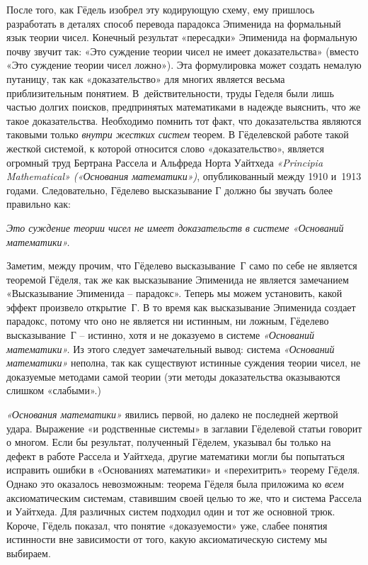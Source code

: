 \documentclass[../main.tex]{subfiles}
\begin{document}
После того, как Гёдель изобрел эту кодирующую схему, ему пришлось разработать в деталях способ перевода парадокса Эпименида на формальный язык теории чисел. Конечный результат «пересадки» Эпименида на формальную почву звучит так: «Это суждение теории чисел не имеет доказательства» (вместо «Это суждение теории чисел ложно»). Эта формулировка может создать немалую путаницу, так как «доказательство» для многих является весьма приблизительным понятием. В~действительности, труды Геделя были лишь частью долгих поисков, предпринятых математиками в надежде выяснить, что же такое доказательства. Необходимо помнить тот факт, что доказательства являются таковыми только \emph{внутри жестких систем} теорем. В Гёделевской работе такой жесткой системой, к которой относится слово «доказательство», является огромный труд Бертрана Рассела и Альфреда Норта Уайтхеда \emph{«Principia Mathematical» («Основания математики»)}, опубликованный между 1910 и~1913 годами. Следовательно, Гёделево высказывание Г должно бы звучать более правильно как:

\emph{Это суждение теории чисел не имеет доказательств в системе «Оснований математики».}

Заметим, между прочим, что Гёделево высказывание~Г само по себе не является теоремой Гёделя, так же как высказывание Эпименида не является замечанием «Высказывание Эпименида \--- парадокс». Теперь мы можем установить, какой эффект произвело открытие~Г\@. В то время как высказывание Эпименида создает парадокс, потому что оно не является ни истинным, ни ложным, Гёделево высказывание~Г \--- истинно, хотя и не доказуемо в системе \emph{«Оснований математики».} Из этого следует замечательный вывод: система \emph{«Оснований математики»} неполна, так как существуют истинные суждения теории чисел, не доказуемые методами самой теории (эти методы доказательства оказываются слишком «слабыми».)

\emph{«Основания математики»} явились первой, но далеко не последней жертвой удара. Выражение «и родственные системы» в заглавии Гёделевой статьи говорит о многом. Если бы результат, полученный Гёделем, указывал бы только на дефект в работе Рассела и Уайтхеда, другие математики могли бы попытаться исправить ошибки в «Основаниях математики» и «перехитрить» теорему Гёделя. Однако это оказалось невозможным: теорема Гёделя была приложима ко \emph{всем} аксиоматическим системам, ставившим своей целью то же, что и система Рассела и Уайтхеда. Для различных систем подходил один и тот же основной трюк. Короче, Гёдель показал, что понятие «доказуемости» уже, слабее понятия истинности вне зависимости от того, какую аксиоматическую систему мы выбираем.
\end{document}
